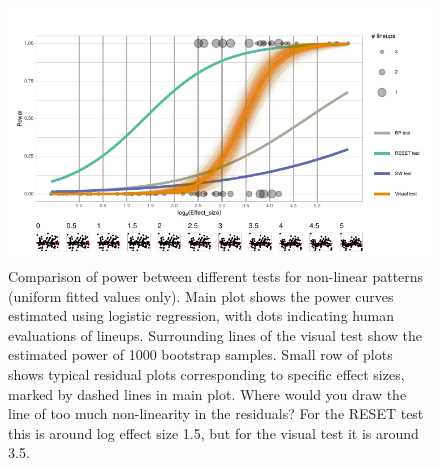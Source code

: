 \documentclass[]{interact}
\theoremstyle{plain}%
\theoremstyle{definition}
\theoremstyle{remark}
\begin{document}
\begin{figure}

{\centering \includegraphics[width=1\linewidth]{paper_comparison_files/figure-latex/polypower-1} 

}

\caption{Comparison of power between different tests for non-linear patterns (uniform fitted values only). Main plot shows the power curves estimated using logistic regression, with dots indicating human evaluations of lineups. Surrounding lines of the visual test show the estimated power of 1000 bootstrap samples. Small row of plots shows typical residual plots corresponding to specific effect sizes, marked by dashed lines in main plot. Where would you draw the line of too much non-linearity in the residuals? For the RESET test this is around log effect size 1.5, but for the visual test it is around 3.5.}\label{fig:polypower}
\end{figure}
\end{document}
